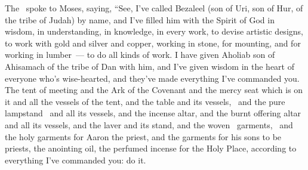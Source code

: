 
\begin{inparaenum}
   The \lord\ spoke to Moses, saying,%
   ``See, I've called Bezaleel (son of Uri, son of Hur, of the tribe of Judah) by name,%
   and I've filled him with the Spirit of God in wisdom, in understanding, in knowledge, in every work,%
   to devise artistic designs, to work with gold and silver and copper,%
   working in stone, for mounting, and for working in lumber~--- to do all kinds of work.%
   I have given Aholiab son of Ahisamach of the tribe of Dan with him, and I've given wisdom in the heart of everyone who's wise-hearted, and they've made everything I've commanded you.%
   The tent of meeting and the Ark of the Covenant and the mercy seat which is on it and all the vessels of the tent,%
   and the table and its vessels,\
  and the pure lampstand\
  \halot{xxxx}{not candlestick}
  and all its vessels, and the incense altar,%
  \verse{31:9} and the burnt offering altar and all its vessels, and the laver and its stand,%
  \verse{31:10} and the woven\
  garments,\
  and the holy garments for Aaron the priest, and the garments for his sons to be priests,%
  \verse{31:11} the anointing oil, the perfumed incense for the Holy Place, according to everything I've commanded you: do it.%
  

\end{inparaenum}

